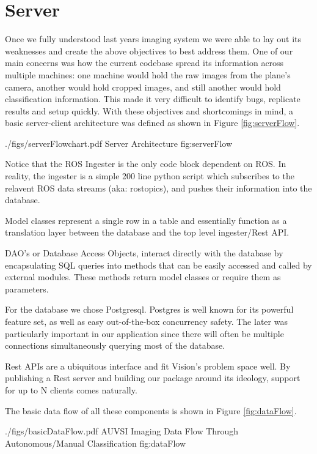 \documentclass[]{auvsi_doc}
\begin{document}
\section{Server}

Once we fully understood last years imaging system we were able to lay out its weaknesses
and create the above objectives to best address them. One of our main concerns was how the 
current codebase spread its information across multiple machines: one machine would hold 
the raw images from the plane's camera, another would hold cropped images, and still another
would hold classification information. This made it very difficult to identify bugs, replicate
results and setup quickly. With these objectives and shortcomings in mind, a 
basic server-client architecture was defined as shown in Figure \ref{fig:serverFlow}.

\AUVSIFigure
{./figs/serverFlowchart.pdf}
{\textwidth}
{Server Architecture}
{fig:serverFlow}

Notice that the ROS Ingester is the only code block dependent on ROS. In reality, the
ingester is a simple 200 line python script which subscribes to the relavent ROS data
streams (aka: rostopics), and pushes their information into the database.

Model classes represent a single row in a table and essentially function as a translation
layer between the database and the top level ingester/Rest API. 

DAO's or Database Access Objects, interact directly with the database by encapsulating
SQL queries into methods that can be easily accessed and called by external modules.
These methods return model classes or require them as parameters.

For the database we chose Postgresql. Postgres is well known for its powerful
feature set, as well as easy out-of-the-box concurrency safety. The later was particularly
important in our application since there will often be multiple connections simultaneously 
querying most of the database.

Rest APIs are a ubiquitous interface and fit Vision's problem space well. By publishing a
Rest server and building our package around its ideology, support for up to N clients comes
naturally. 

The basic data flow of all these components is shown in Figure \ref{fig:dataFlow}.

\AUVSIFigure
{./figs/basicDataFlow.pdf}
{\textwidth}
{AUVSI Imaging Data Flow Through Autonomous/Manual Classification}
{fig:dataFlow}
\end{document}
